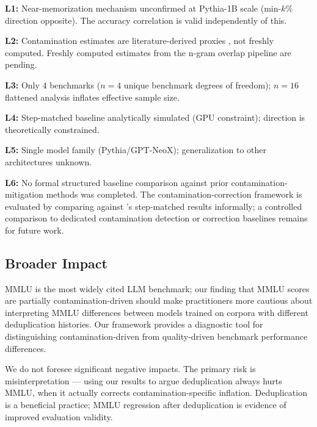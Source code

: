 \textbf{L1:} Near-memorization mechanism unconfirmed at Pythia-1B scale (min-$k$\% direction opposite).
The accuracy correlation is valid independently of this.

\textbf{L2:} Contamination estimates are literature-derived proxies \citep{Lee2022Deduplicating},
not freshly computed. Freshly computed estimates from the n-gram overlap pipeline are pending.

\textbf{L3:} Only 4 benchmarks ($n=4$ unique benchmark degrees of freedom); $n=16$ flattened analysis
inflates effective sample size.

\textbf{L4:} Step-matched baseline analytically simulated (GPU constraint); direction is
theoretically constrained.

\textbf{L5:} Single model family (Pythia/GPT-NeoX); generalization to other architectures unknown.

\textbf{L6:} No formal structured baseline comparison against prior contamination-mitigation methods was completed. The contamination-correction framework is evaluated by comparing against \citet{Biderman2023Pythia}'s step-matched results informally; a controlled comparison to dedicated contamination detection or correction baselines remains for future work.

\subsection{Broader Impact}

MMLU is the most widely cited LLM benchmark; our finding that MMLU scores are partially
contamination-driven should make practitioners more cautious about interpreting MMLU
differences between models trained on corpora with different deduplication histories.
Our framework provides a diagnostic tool for distinguishing contamination-driven from
quality-driven benchmark performance differences.

We do not foresee significant negative impacts. The primary risk is misinterpretation ---
using our results to argue deduplication always hurts MMLU, when it actually corrects
contamination-specific inflation. Deduplication is a beneficial practice; MMLU regression
after deduplication is evidence of improved evaluation validity.
